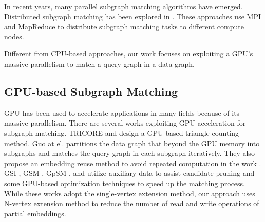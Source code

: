 In recent years, many parallel subgraph matching algorithms have emerged.  Distributed subgraph matching  has been explored in \cite{afrati2013enumerating, shao2014parallel,shi2020graphpi,talukder2016distributed,sun2018parallelizing,plantenga2013inexact,reza2018prunejuice}. These approaches use MPI and MapReduce to distribute subgraph matching tasks to different compute nodes.

Different from CPU-based approaches, our work focuses on exploiting a GPU's massive parallelism to match a query graph in a data graph.

\subsection{GPU-based Subgraph Matching}
GPU has been used to accelerate applications in many fields because of its massive parallelism. There are several works exploiting GPU acceleration for subgraph matching. TRICORE \cite{hu2018tricore}  and \cite{green2014fast} design a GPU-based triangle counting method. Guo at el. \cite{guo2020gpu} partitions the data graph that beyond the GPU memory into subgraphs and matches the query graph in each subgraph iteratively. They also propose an embedding reuse method to avoid repeated computation in the work \cite{guo2020exploiting}. GSI \cite{zeng2020gsi}, GSM \cite{wang2020fast}, GpSM \cite{tran2015fast}, and \cite{lin2016network} utilize auxiliary data to assist candidate pruning and some GPU-based optimization techniques to speed up the matching process. While these works adopt the single-vertex extension method, our approach uses N-vertex extension method to reduce the number of read and write operations of partial embeddings.

